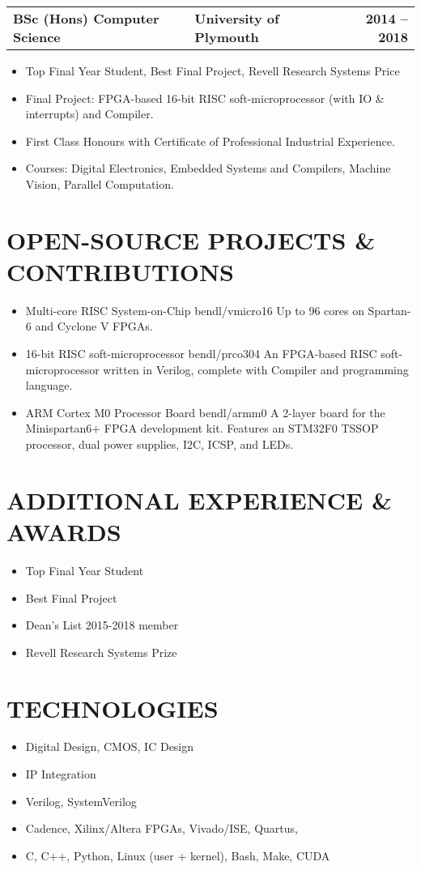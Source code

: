 \documentclass[letterpaper,11pt]{article}
\newcommand{\resumeItem}[1]{
  \item\small{
    {#1 \vspace{-5pt}}
  }
}
\newcommand{\resumeSubheading}[3]{
    \begin{center}
    \begin{tabularx}{1\textwidth}{XP{9.4cm}r}
      \small\textbf{#1} & \textbf{#2} & \textbf{#3}
    \end{tabularx}\vspace{-7pt}
    \end{center}
}
\newcommand{\resumeItemListStart}{\begin{itemize}[label={\large\textbullet}]}
\newcommand{\resumeItemListEnd}{\end{itemize}\vspace{10pt}}
\begin{document}
    \begin{tabularx}{1\textwidth}{p{7.5cm}Xr}
      \small\textbf{BSc (Hons) Computer Science} & \small\textbf{University of Plymouth} & \small\textbf{2014 – 2018}  \\
    \end{tabularx}\vspace{-3pt}
    \resumeItemListStart
    \resumeItem{Top Final Year Student, Best Final Project, Revell Research Systems Price}
\resumeItem{Final Project: FPGA-based 16-bit RISC soft-microprocessor (with IO \& interrupts) and Compiler.}
\resumeItem{First Class Honours with Certificate of Professional Industrial Experience.}
\resumeItem{Courses: Digital Electronics, Embedded Systems and Compilers, Machine Vision, Parallel Computation.}
    \resumeItemListEnd


\section{OPEN-SOURCE PROJECTS \& CONTRIBUTIONS}
    \resumeItemListStart
\resumeItem{Multi-core RISC System-on-Chip bendl/vmicro16 Up to 96 cores on Spartan-6 and Cyclone V FPGAs.}
\resumeItem{16-bit RISC soft-microprocessor bendl/prco304 An FPGA-based RISC soft-microprocessor written in
Verilog, complete with Compiler and programming language.}
\resumeItem{ARM Cortex M0 Processor Board bendl/armm0 A 2-layer board for the Minispartan6+ FPGA
development kit. Features an STM32F0 TSSOP processor, dual power supplies, I2C, ICSP, and LEDs.}
    \resumeItemListEnd

\section{ADDITIONAL EXPERIENCE \& AWARDS}
    \vspace{-15pt}
\begin{multicols}{2}
    \resumeItemListStart
    \resumeItem{Top Final Year Student}
    \resumeItem{Best Final Project}
    \resumeItemListEnd
\columnbreak
    \resumeItemListStart
    \resumeItem{Dean’s List 2015-2018 member}
    \resumeItem{Revell Research Systems Prize}
    \resumeItemListEnd
\end{multicols}\vspace{5pt}

\section{TECHNOLOGIES}
    \resumeItemListStart
\resumeItem{Digital Design, CMOS, IC Design}
\resumeItem{IP Integration}
\resumeItem{Verilog, SystemVerilog}
\resumeItem{Cadence, Xilinx/Altera FPGAs, Vivado/ISE, Quartus, }
\resumeItem{C, C++, Python, Linux (user + kernel), Bash, Make, CUDA}
    \resumeItemListEnd


\end{document}
